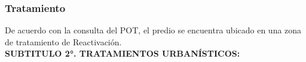 \documentclass[12pt,a4paper,twoside]{article}
\begin{document}
{%


\subsubsection{Tratamiento}


De acuerdo con la consulta del POT, el predio se encuentra ubicado en una zona de tratamiento de Reactivación. \\

\textbf{SUBTITULO 2°. TRATAMIENTOS URBANÍSTICOS:} \\

}
\end{document}
